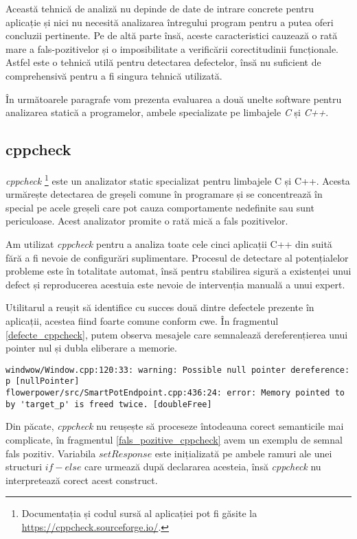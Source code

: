 Această tehnică de analiză nu depinde de date de intrare concrete pentru aplicație și nici nu necesită analizarea întregului program pentru a putea oferi concluzii pertinente. Pe de altă parte însă, aceste caracteristici cauzează o rată mare a fals-pozitivelor și o imposibilitate a verificării corectitudinii funcționale. Astfel este o tehnică utilă pentru detectarea defectelor, însă nu suficient de comprehensivă pentru a fi singura tehnică utilizată.

În următoarele paragrafe vom prezenta evaluarea a două unelte software pentru analizarea statică a programelor, ambele specializate pe limbajele \textit{C} și \textit{C++}.

\subsection*{cppcheck}

\textit{cppcheck} \footnote{Documentația și codul sursă al aplicației pot fi găsite la \url{https://cppcheck.sourceforge.io/}.} este un analizator static specializat pentru limbajele C și C++. Acesta urmărește detectarea de greșeli comune în programare și se concentrează în special pe acele greșeli care pot cauza comportamente nedefinite sau sunt periculoase. Acest analizator promite o rată mică a fals pozitivelor.

Am utilizat \textit{cppcheck} pentru a analiza toate cele cinci aplicații C++ din suită fără a fi nevoie de configurări suplimentare. Procesul de detectare al potențialelor probleme este în totalitate automat, însă pentru stabilirea sigură a existenței unui defect și reproducerea acestuia este nevoie de intervenția manuală a unui expert.

Utilitarul a reușit să identifice cu succes două dintre defectele prezente în aplicații, acestea fiind foarte comune conform \acrfull{cwe}. În fragmentul \ref{defecte_cppcheck}, putem observa mesajele care semnalează dereferențierea unui pointer nul și dubla eliberare a memorie. 

\begin{lstlisting}[caption={Cele două defecte detectate de \textit{cppcheck}}, label={defecte_cppcheck}]
windwow/Window.cpp:120:33: warning: Possible null pointer dereference: p [nullPointer]
flowerpower/src/SmartPotEndpoint.cpp:436:24: error: Memory pointed to by 'target_p' is freed twice. [doubleFree]
\end{lstlisting}

Din păcate, \textit{cppcheck} nu reușește să proceseze întodeauna corect semanticile mai complicate, în fragmentul \ref{fals_pozitive_cppcheck} avem un exemplu de semnal fals pozitiv. Variabila $setResponse$ este inițializată pe ambele ramuri ale unei structuri $if - else$ care urmează după declararea acesteia, însă \textit{cppcheck} nu interpretează corect acest construct.

